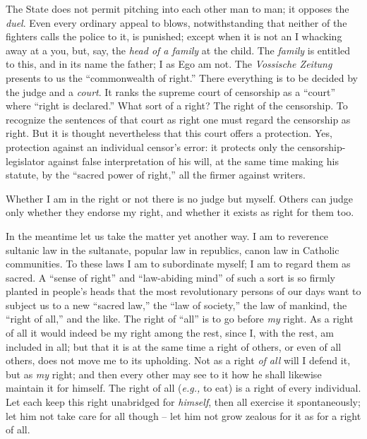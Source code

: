 The State does not permit pitching into each other man to man; it opposes the 
\textit{duel}. Even every ordinary appeal to blows, notwithstanding that 
neither of the fighters calls the police to it, is punished; except when it is 
not an I whacking away at a you, but, say, the \textit{head of a family} at 
the child. The \textit{family} is entitled to this, and in its name the 
father; I as Ego am not. The \textit{Vossische Zeitung} presents to us the 
``commonwealth of right.'' There everything is to be decided by the judge 
and a \textit{court}. It ranks the supreme court of censorship as a 
``court'' where ``right is declared.'' What sort of a right? The right of 
the censorship. To recognize the sentences of that court as right one must 
regard the censorship as right. But it is thought nevertheless that this court 
offers a protection. Yes, protection against an individual censor's error: it 
protects only the censorship-legislator against false interpretation of his 
will, at the same time making his statute, by the ``sacred power of right,'' 
all the firmer against writers.

Whether I am in the right or not there is no judge but myself. Others can 
judge only whether they endorse my right, and whether it exists as right for 
them too.

In the meantime let us take the matter yet another way. I am to reverence 
sultanic law in the sultanate, popular law in republics, canon law in Catholic 
communities. To these laws I am to subordinate myself; I am to regard them as 
sacred. A ``sense of right'' and ``law-abiding mind'' of such a sort is so 
firmly planted in people's heads that the most revolutionary persons of our 
days want to subject us to a new ``sacred law,'' the ``law of society,'' 
the law of mankind, the ``right of all,'' and the like. The right of 
``all'' is to go before \textit{my} right. As a right of all it would indeed 
be my right among the rest, since I, with the rest, am included in all; but 
that it is at the same time a right of others, or even of all others, does not 
move me to its upholding. Not as a right \textit{of all} will I defend it, but 
as \textit{my} right; and then every other may see to it how he shall likewise 
maintain it for himself. The right of all (\textit{e.g.,} to eat) is a right 
of every individual. Let each keep this right unabridged for \textit{himself}, 
then all exercise it spontaneously; let him not take care for all though -- 
let him not grow zealous for it as for a right of all.

